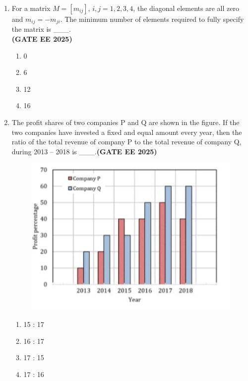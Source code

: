 \documentclass[journal,12pt,onecolumn]{IEEEtran}
\theoremstyle{remark}
\begin{document}
\begin{enumerate}
\item For a matrix $M = [m_{ij}], \, i,j = 1,2,3,4$, the diagonal elements are all zero and $m_{ij} = -m_{ji}$. The minimum number of elements required to fully specify the matrix is \_\_\_. \\
\hfill \textbf{(GATE EE 2025)}
\begin{enumerate}
\item 0
\item 6
\item 12
\item 16
\end{enumerate}
\item The profit shares of two companies P and Q are shown in the figure. 
If the two companies have invested a fixed and equal amount every year, then the ratio of the total revenue of company P to the total revenue of company Q, during 2013 -- 2018 is \_\_\_.\hfill \textbf{(GATE EE 2025)}
\begin{figure}[H]
    \centering
    \includegraphics[width=0.5\linewidth]{fig10.png}
    \caption{}
    \label{fig10}
\end{figure}
\begin{enumerate}
\item  15 : 17 \item   16 : 17 \item   17 : 15 \item  17 : 16
\end{enumerate}


\end{enumerate}
\end{document}
